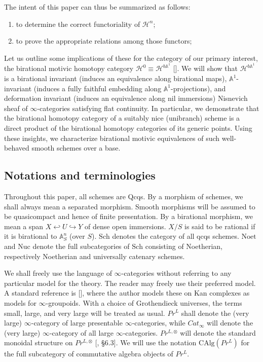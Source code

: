 The intent of this paper can thus be summarized as follows: 
\begin{enumerate}
    \item to determine the correct functoriality of $\mathcal{H}^n$;
    \item to prove the appropriate relations among those functors;
\end{enumerate}

Let us outline some implications of these for the category of our primary interest, the birational motivic homotopy category $\mathcal{H}^0\equiv\mathcal{H}^{b\mathbb{A}^1}$ [\cite{0bat}]. We will show that $\mathcal{H}^{b\mathbb{A}^1}$ is a birational invariant (induces an equivalence along birational maps), $\mathbb{A}^1$-invariant (induces a fully faithful embedding along $\mathbb{A}^1$-projections), and deformation invariant (induces an equivalence along nil immersions) Nisnevich sheaf of $\infty$-categories satisfying flat continuity. In particular, we demonstrate that the birational homotopy category of a suitably nice (unibranch) scheme is a direct product of the birational homotopy categories of its generic points. Using these insights, we characterize birational motivic equivalences of such well-behaved smooth schemes over a base.

\subsection{Notations and terminologies}
Throughout this paper, all schemes are Qcqs. By a morphism of schemes, we shall always mean a separated morphism. Smooth morphisms will be assumed to be quasicompact and hence of finite presentation. By a birational morphism, we mean a span $X\hookleftarrow
 U \hookrightarrow Y$ of dense open immersions. $X/S$ is said to be rational if it is birational to $\mathbb{A}^n_S$ (over $S$). $\mathrm{Sch}$ denotes the category of all qcqs schemes. $\mathrm{Noet}$ and $\mathrm{Nuc}$ denote the full subcategories of $\mathrm{Sch}$ consisting of Noetherian, respectively Noetherian and universally catenary schemes. 

We shall freely use the language of $\infty$-categories without referring to any particular model for the theory. The reader may freely use their preferred model. A standard reference is [\cite{lurie2009higher}], where the author models these on Kan complexes as models for $\infty$-groupoids. With a choice of Grothendieck universes, the terms small, large, and very large will be treated as usual. $Pr^L$ shall denote the (very large) $\infty$-category of large presentable $\infty$-categories, while $Cat_{\infty}$ will denote the (very large) $\infty$-category of all large $\infty$-categories. $Pr^{L,\otimes}$ will denote the standard monoidal structure on $Pr^{L,\otimes}$ [\cite{lurie2017higher}, \S6.3]. We will use the notation $\mathrm{CAlg}(Pr^L)$ for the full subcategory of commutative algebra objects of $Pr^L$.


